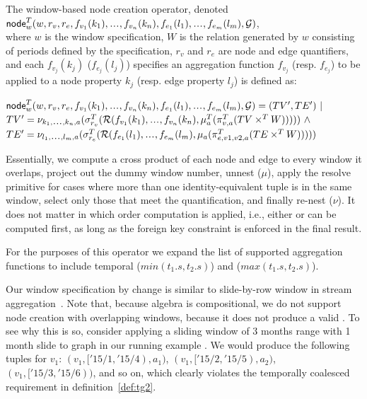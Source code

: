 \begin{definition}
\label{def:nodecrw}
The window-based node creation operator, denoted
$\insql{node}^T_w(w,r_v,r_e,f_{v_1}(k_1)\varlist f_{v_n}(k_n),f_{e_1}(l_1)\varlist f_{e_m}(l_m),\ttt)$,\\
where $w$ is the window specification, $W$ is the relation generated
by $w$ consisting of periods defined by the specification, $r_v$ and
$r_e$ are node and edge quantifiers, and each $f_{v_j}(k_j)$
($f_{e_j}(l_j)$) specifies an aggregation function $f_{v_j}$
(resp. $f_{e_j}$) to be applied to a node property $k_j$ (resp. edge
property $l_j$) is defined as:

$\insql{node}^T_w(w,r_v,r_e,f_{v_1}(k_1)\varlist f_{v_n}(k_n),f_{e_1}(l_1)\varlist f_{e_m}(l_m),\ttt) = (TV', TE') ~|~ $\\$TV' = \nu_{k_1\varlist k_n,a}(\sigma^T_{r_v}(\resolve{f_{v_1}(k_1)\varlist f_{v_n}(k_n)}{\break\mu^T_a(\pi^T_{v,a}(TV \times^T W))})) ~\land$\\
$TE' = \nu_{l_1\varlist l_m,a}(\sigma^T_{r_e}(\resolve{f_{e_1}(l_1)\varlist f_{e_m}(l_m)}{\mu_a(\break\pi^T_{e,v1,v2,a}(TE \times^T W))}))$
\end{definition}

Essentially, we compute a cross product of each node and edge to every
window it overlaps, project out the dummy window number, unnest
($\mu$), apply the resolve primitive for cases
where more than one identity-equivalent tuple is in the same window,
select only those that meet the quantification, and finally re-nest
($\nu$).  It does not matter in which order
computation is applied, i.e., either \tv or \te can be computed first,
as long as the foreign key constraint is enforced in the final result.

For the purposes of this operator we expand the list of supported
aggregation functions to include temporal 
($min(t_1.s,t_2.s)$) and  ($max(t_1.s,t_2.s)$).

Our window specification by change is similar to slide-by-row window
in stream aggregation~\cite{Li2005}.  Note that, because \tg algebra
is compositional, we do not support node creation with overlapping
windows, because it does not produce a valid \tg.  To see why this is
so, consider applying a sliding window of 3 months range with 1 month
slide to graph  in our running example \tg \ttt.  We would
produce the following tuples for $v_1$: $(v_1, ['15/1, '15/4), a_1)$,
  $(v_1, ['15/2, '15/5), a_2)$, $(v_1, ['15/3, '15/6))$, and so on, which
      clearly violates the temporally coalesced requirement in
      definition~\ref{def:tg2}.

